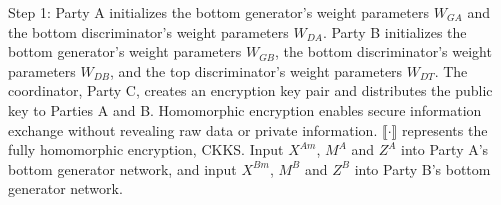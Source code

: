 \documentclass[final,1p,times]{elsarticle}
\begin{document}
Step 1: Party A initializes the bottom generator's weight parameters $W_{GA}$ and the bottom discriminator's weight parameters $W_{DA}$. Party B initializes the bottom generator's weight parameters $W_{GB}$, the bottom discriminator's weight parameters $W_{DB}$, and the top discriminator's weight parameters $W_{DT}$. The coordinator, Party C, creates an encryption key pair and distributes the public key to Parties A and B. Homomorphic encryption enables secure information exchange without revealing raw data or private information. $\llbracket\cdot\rrbracket$ represents the fully homomorphic encryption, CKKS. Input $X^{Am}$, $M^A$ and $Z^A$ into Party A's bottom generator network, and input $X^{Bm}$, $M^B$ and $Z^B$ into Party B's bottom generator network. 
\end{document}
